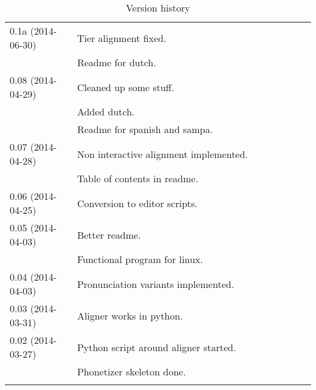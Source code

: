 \begin{longtable}{|p{0.22\linewidth}p{0.8\linewidth}|}
	0.1a (2014{-}06{-}30) & \tabitem{} Tier alignment fixed.\\
		& \tabitem{} Readme for dutch.\\
	\midrule
	0.08 (2014{-}04{-}29) & \tabitem{} Cleaned up some stuff.\\
		& \tabitem{} Added dutch.\\
		& \tabitem{} Readme for spanish and sampa.\\
	\midrule
	0.07 (2014{-}04{-}28) & \tabitem{} Non interactive alignment implemented.\\
		& \tabitem{} Table of contents in readme.\\
	\midrule
	0.06 (2014{-}04{-}25) & \tabitem{} Conversion to editor scripts.\\
	\midrule
	0.05 (2014{-}04{-}03) & \tabitem{} Better readme.\\
		& \tabitem{} Functional program for linux.\\
	\midrule
	0.04 (2014{-}04{-}03) & \tabitem{} Pronunciation variants implemented.\\
	\midrule
	0.03 (2014{-}03{-}31) & \tabitem{} Aligner works in python.\\
	\midrule
	0.02 (2014{-}03{-}27) & \tabitem{} Python script around aligner started.\\
		& \tabitem{} Phonetizer skeleton done.\\
	\bottomrule
	\caption{Version history}
\end{longtable}





